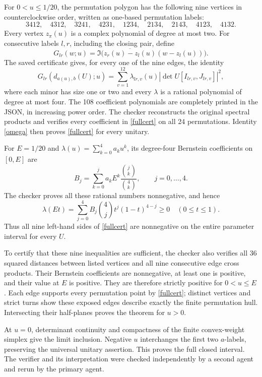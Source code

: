 \documentclass[11pt]{article}
\begin{document}
For $0<u\le1/20$, the permutation polygon has the following nine vertices in counterclockwise order, written as one-based permutation labels:
\[
3412,\quad4312,\quad3241,\quad4231,\quad1234,\quad
2134,\quad2143,\quad4123,\quad4132.
\]
Every vertex $z_\pi(u)$ is a complex polynomial of degree at most two. For consecutive labels $l,r$, including the closing pair, define
\[
G_{lr}(w;u)=\Im\bigl(\overline{z_r(u)-z_l(u)}(w-z_l(u))\bigr).
\]
The saved certificate gives, for every one of the nine edges, the identity
\begin{equation}\label{fullcert}
G_{lr}(d_{a(u),b}(U);u)=
\sum_{v=1}^{12}\lambda_{lr,v}(u)|\det U[I_{lr,v},J_{lr,v}]|^2,
\end{equation}
where each minor has size one or two and every $\lambda$ is a rational polynomial of degree at most four. The 108 coefficient polynomials are completely printed in the JSON, in increasing power order. The checker reconstructs the original spectral products and verifies every coefficient in \eqref{fullcert} on all 24 permutations. Identity \eqref{omega} then proves \eqref{fullcert} for every unitary.

For $E=1/20$ and $\lambda(u)=\sum_{k=0}^4a_ku^k$, its degree-four Bernstein coefficients on $[0,E]$ are
\[
B_j=\sum_{k=0}^j a_k E^k\frac{\binom jk}{\binom4k},\qquad j=0,\ldots,4.
\]
The checker proves all these rational numbers nonnegative, and hence
\[
\lambda(Et)=\sum_{j=0}^4 B_j\binom4j t^j(1-t)^{4-j}\ge0\quad(0\le t\le1).
\]
Thus all nine left-hand sides of \eqref{fullcert} are nonnegative on the entire parameter interval for every $U$.

To certify that these nine inequalities are sufficient, the checker also verifies all 36 squared distances between listed vertices and all nine consecutive edge cross products. Their Bernstein coefficients are nonnegative, at least one is positive, and their value at $E$ is positive. They are therefore strictly positive for $0<u\le E$. Each edge supports every permutation point by \eqref{fullcert}; distinct vertices and strict turns show these exposed edges describe exactly the finite permutation hull. Intersecting their half-planes proves the theorem for $u>0$.

At $u=0$, determinant continuity and compactness of the finite convex-weight simplex give the limit inclusion. Negative $u$ interchanges the first two $a$-labels, preserving the universal unitary assertion. This proves the full closed interval. The verifier and its interpretation were checked independently by a second agent and rerun by the primary agent.
\end{document}
